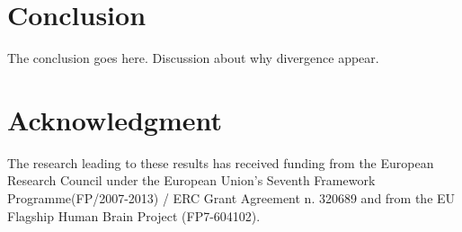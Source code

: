 \documentclass[conference]{IEEEtran}
\begin{document}




\section{Conclusion}
The conclusion goes here.
Discussion about why divergence appear.





\section*{Acknowledgment}
The research leading to these results has received funding from the European Research Council under the European Union's Seventh Framework Programme(FP/2007-2013) / ERC Grant Agreement n. 320689 and from the EU Flagship Human Brain Project (FP7-604102).







%
%
%
%
%




\end{document}
